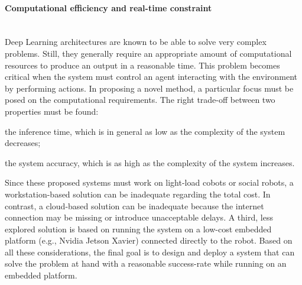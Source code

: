 \paragraph{Computational efficiency and real-time constraint} \mbox{} \\
Deep Learning architectures are known to be able to solve very complex problems. Still, they generally require an appropriate amount of computational resources to produce an output in a reasonable time. This problem becomes critical when the system must control an agent interacting with the environment by performing actions. In proposing a novel method, a particular focus must be posed on the computational requirements. The right trade-off between two properties must be found: 
\begin{enumerate*}[label=\textbf{(\arabic*)}]
\item the inference time, which is in general as low as the complexity of the system decreases; 
\item the system accuracy, which is as high as the complexity of the system increases. 
\end{enumerate*}
Since these proposed systems must work on light-load cobots or social robots, a workstation-based solution can be inadequate regarding the total cost. In contrast, a cloud-based solution can be inadequate because the internet connection may be missing or introduce unacceptable delays. A third, less explored solution is based on running the system on a low-cost embedded platform (e.g., Nvidia Jetson Xavier) connected directly to the robot. Based on all these considerations, the final goal is to design and deploy a system that can solve the problem at hand with a reasonable success-rate while running on an embedded platform.


